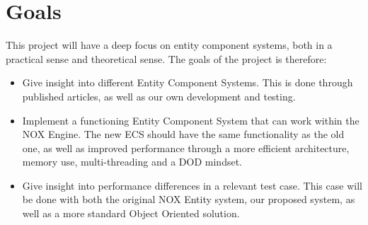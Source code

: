 \section*{Goals}
This project will have a deep focus on entity component systems, both in a practical sense and theoretical sense.
The goals of the project is therefore:
\begin{itemize}
    \item 
        Give insight into different Entity Component Systems. 
        This is done through published articles, as well as our own development and testing.
    
    \item 
        Implement a functioning Entity Component System that can work within the NOX Engine.
        The new ECS should have the same functionality as the old one, as well as improved performance
        through a more efficient architecture, memory use, multi-threading and a DOD mindset.

    \item
        Give insight into performance differences in a relevant test case. 
        This case will be done with both the original NOX Entity system, our proposed system,
        as well as a more standard Object Oriented solution.
\end{itemize}